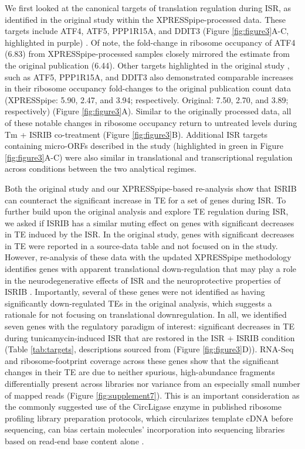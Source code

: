 \documentclass[10pt, oneside]{article}
\begin{document}
We first looked at the canonical targets of translation regulation during ISR, as identified in the original study within the XPRESSpipe-processed data. These targets include ATF4, ATF5, PPP1R15A, and DDIT3 (Figure \ref{fig:figure3}A-C, highlighted in purple) \cite{isrib_riboseq}. Of note, the fold-change in ribosome occupancy of ATF4 (6.83) from XPRESSpipe-processed samples closely mirrored the estimate from the original publication (6.44). Other targets highlighted in the original study \cite{isrib_riboseq}, such as ATF5, PPP1R15A, and DDIT3 also demonstrated comparable increases in their ribosome occupancy fold-changes to the original publication count data (XPRESSpipe: 5.90, 2.47, and 3.94; respectively. Original: 7.50, 2.70, and 3.89; respectively) (Figure \ref{fig:figure3}A). Similar to the originally processed data, all of these notable changes in ribosome occupancy return to untreated levels during Tm + ISRIB co-treatment (Figure \ref{fig:figure3}B). Additional ISR targets containing micro-ORFs described in the study (highlighted in green in Figure \ref{fig:figure3}A-C) were also similar in translational and transcriptional regulation across conditions between the two analytical regimes. \par

Both the original study and our XPRESSpipe-based re-analysis show that ISRIB can counteract the significant increase in TE for a set of genes during ISR. To further build upon the original analysis and explore TE regulation during ISR, we asked if ISRIB has a similar muting effect on genes with significant decreases in TE induced by the ISR. In the original study, genes with significant decreases in TE were reported in a source-data table and not focused on in the study. However, re-analysis of these data with the updated XPRESSpipe methodology identifies genes with apparent translational down-regulation that may play a role in the neurodegenerative effects of ISR and the neuroprotective properties of ISRIB \cite{isrib_neuroprotective,isrib_neuroprotective2,isrib_neuroprotective3,isrib_neuroprotective4}. Importantly, several of these genes were not identified as having significantly down-regulated TEs in the original analysis, which suggests a rationale for not focusing on translational downregulation. In all, we identified seven genes with the regulatory paradigm of interest: significant decreases in TE during tunicamycin-induced ISR that are restored in the ISR + ISRIB condition (Table \ref{tab:targets}, descriptions sourced from \cite{genecards, ncbi, uniprot} (Figure \ref{fig:figure3}D)). RNA-Seq and ribosome-footprint coverage across these genes show that the significant changes in their TE are due to neither spurious, high-abundance fragments differentially present across libraries nor variance from an especially small number of mapped reads (Figure \ref{fig:supplement7}). This is an important consideration as the commonly suggested use of the CircLigase enzyme in published ribosome profiling library preparation protocols, which circularizes template cDNA before sequencing, can bias certain molecules' incorporation into sequencing libraries based on read-end base content alone \cite{circligase_bias}. \par
\end{document}
